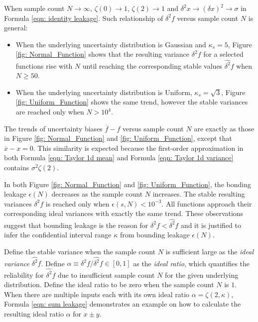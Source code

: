 \documentclass[twoside]{article}
\numberwithin{equation}{section}
\begin{document}
When sample count $N \rightarrow \infty$, $\zeta(0) \rightarrow 1$, $\zeta(2) \rightarrow 1$ and $\delta^2 x \rightarrow (\delta x)^2 \rightarrow \sigma$ in Formula \eqref{eqn: identity leakage}.
Such relationship of $\delta^2 f$ versus sample count $N$ is general:
\begin{itemize}
\item
When the underlying uncertainty distribution is Gaussian and $\kappa_s = 5$, Figure \ref{fig: Normal_Function} shows that the resulting variance $\delta^2 f$ for a selected functions rise with $N$ until reaching the corresponding stable values $\widehat{\delta^2} f$ when $N \geq 50$.

\item
When the underlying uncertainty distribution is Uniform, $\kappa_s = \sqrt{3}$, Figure \ref{fig: Uniform_Function} shows the same trend, however the stable variances are reached only when $N > 10^4$.
\end{itemize}
The trends of uncertainty biases $\overline{f} - f$ versus sample count $N$ are exactly as those in Figure \ref{fig: Normal_Function} and \ref{fig: Uniform_Function}, except that  $\overline{x} - x = 0$.
This similarity is expected because the first-order approximation in both Formula \eqref{eqn: Taylor 1d mean} and Formula \eqref{eqn: Taylor 1d variance} contains $\sigma^2 \zeta(2)$. 

In both Figure \ref{fig: Normal_Function} and \ref{fig: Uniform_Function}, the bonding leakage $\epsilon(N)$ decreases as the sample count $N$ increases.
The stable resulting variances $\delta^2 f$ is reached only when $\epsilon(s, N) < 10^{-3}$.
All functions approach their corresponding ideal variances with exactly the same trend.
These observations suggest that bounding leakage is the reason for $\delta^2 f < \widehat{\delta^2} f$ and it is justified to infer the confidential interval range $\kappa$ from bounding leakage $\epsilon(N)$.

Define the stable variance when the sample count $N$ is sufficient large as the \emph{ideal variance} $\widehat{\delta^2} f$.
Define $\alpha \equiv \delta^2 f/\widehat{\delta^2} f \in [0, 1]$ as the \emph{ideal ratio}, which quantifies the reliability for $\widehat{\delta^2} f$  due to insufficient sample count $N$ for the given underlying distribution.
Define the ideal ratio to be zero when the sample count $N$ is $1$.
When there are multiple inputs each with its own ideal ratio $\alpha=\zeta(2, \kappa)$, Formula \eqref{eqn: sum leakage} demonstrates an example on how to calculate the resulting ideal ratio $\alpha$ for $x \pm y$.
\end{document}
